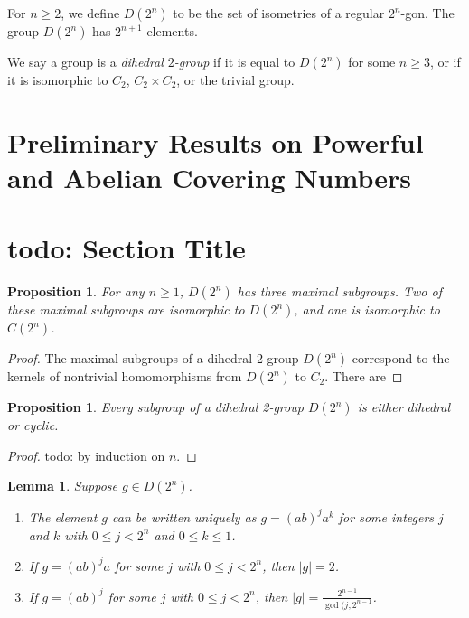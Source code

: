 \documentclass{amsart}
\numberwithin{equation} {section}
\newtheorem{lemma}[equation]{Lemma}
\newtheorem{proposition}[equation]{Proposition}
\theoremstyle{definition}
\begin{document}
For $n \geq 2$, we define $D(2^n)$ to be the set of isometries of a regular $2^n$-gon. The group $D(2^n)$ has $2^{n+1}$ elements. 

We say a group is a  \textit{dihedral $2$-group} if it is equal to $D(2^n)$ for some $n \geq 3$, or if it is isomorphic to $C_2$, $C_2 \times C_2$, or the trivial group. 

\section{Preliminary Results on Powerful and Abelian Covering Numbers}



\section{todo: Section Title}

\begin{proposition}
For any $n \geq 1$, $D(2^n)$ has three maximal subgroups. Two of these maximal subgroups are isomorphic to $D(2^n)$, and one is isomorphic to $C(2^n)$.
\end{proposition}

\begin{proof}
The maximal subgroups of a dihedral 2-group $D(2^n)$ correspond to  the kernels of nontrivial homomorphisms from $D(2^n)$ to $C_2$. There are 
\end{proof}


\begin{proposition}\label{p:dihedral-or-cyclic}
Every subgroup of a dihedral 2-group $D(2^n)$ is either dihedral or cyclic.
\end{proposition}

\begin{proof}
todo: by induction on $n$. 
\end{proof}

\begin{lemma}\label{l:normal-form}
Suppose $g \in D(2^n)$. 
\begin{enumerate}
\item[(i.)] The element $g$ can be written uniquely as $g = (ab)^ja^k$ for some integers $j$ and $k$ with $0 \leq j < 2^{n}$ and $0 \leq k \leq 1$. 
\item[(ii.)] If $g = (ab)^ja$ for some $j$ with $0 \leq j < 2^{n}$, then $|g| = 2$. 
\item[(iii.)] If $g = (ab)^j$ for some $j$ with $0 \leq j < 2^{n}$, then $|g| = \displaystyle\frac{2^{n-1}}{\gcd(j,2^{n-1}}$. 
\end{enumerate}
\end{lemma}
\end{document}
